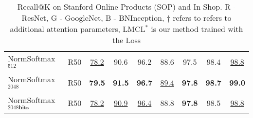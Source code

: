 \documentclass{bmvc2k}
\begin{document}
\begin{table*}
\begin{center}
{\begin{tabular}{l | c | c c c | c c c c }
NormSoftmax$^{512}$  & R50 & \underline{78.2} & 90.6 & 96.2 & 88.6 & 97.5 & 98.4 & \underline{98.8} \\
NormSoftmax$^{2048}$ & R50  & \textbf{79.5} & \textbf{91.5} & \textbf{96.7} & \underline{89.4} & \textbf{97.8} & \textbf{98.7} & \textbf{99.0} \\
NormSoftmax$^{2048\textbf{bits}}$ & R50  & \underline{78.2} & \underline{90.9} & \underline{96.4} & 88.8 & \textbf{97.8} & 98.5 & \underline{98.8} \\
\hline
\end{tabular}
}
\end{center}
\caption{Recall@K on Stanford Online Products (SOP) and In-Shop. R - ResNet, G - GoogleNet, B - BNInception, $\dagger$ refers to refers to additional attention parameters, LMCL$^\ast$ is our method trained with the Loss}
\label{tab:metric_stanford}

\end{table*}
\end{document}
